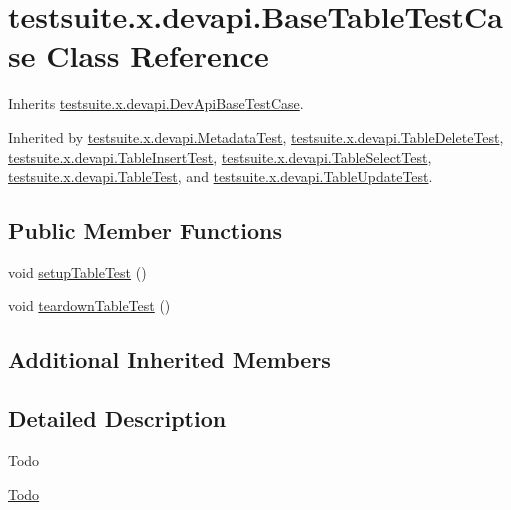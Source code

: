 \hypertarget{classtestsuite_1_1x_1_1devapi_1_1_base_table_test_case}{}\section{testsuite.\+x.\+devapi.\+Base\+Table\+Test\+Case Class Reference}
\label{classtestsuite_1_1x_1_1devapi_1_1_base_table_test_case}


Inherits \mbox{\hyperlink{classtestsuite_1_1x_1_1devapi_1_1_dev_api_base_test_case}{testsuite.\+x.\+devapi.\+Dev\+Api\+Base\+Test\+Case}}.



Inherited by \mbox{\hyperlink{classtestsuite_1_1x_1_1devapi_1_1_metadata_test}{testsuite.\+x.\+devapi.\+Metadata\+Test}}, \mbox{\hyperlink{classtestsuite_1_1x_1_1devapi_1_1_table_delete_test}{testsuite.\+x.\+devapi.\+Table\+Delete\+Test}}, \mbox{\hyperlink{classtestsuite_1_1x_1_1devapi_1_1_table_insert_test}{testsuite.\+x.\+devapi.\+Table\+Insert\+Test}}, \mbox{\hyperlink{classtestsuite_1_1x_1_1devapi_1_1_table_select_test}{testsuite.\+x.\+devapi.\+Table\+Select\+Test}}, \mbox{\hyperlink{classtestsuite_1_1x_1_1devapi_1_1_table_test}{testsuite.\+x.\+devapi.\+Table\+Test}}, and \mbox{\hyperlink{classtestsuite_1_1x_1_1devapi_1_1_table_update_test}{testsuite.\+x.\+devapi.\+Table\+Update\+Test}}.

\subsection*{Public Member Functions}
\begin{DoxyCompactItemize}
\item 
void \mbox{\hyperlink{classtestsuite_1_1x_1_1devapi_1_1_base_table_test_case_ab75cadb98051a2ce2054cf8a1e870375}{setup\+Table\+Test}} ()
\item 
void \mbox{\hyperlink{classtestsuite_1_1x_1_1devapi_1_1_base_table_test_case_acd54bd05e05774f819784bbc94c31535}{teardown\+Table\+Test}} ()
\end{DoxyCompactItemize}
\subsection*{Additional Inherited Members}


\subsection{Detailed Description}
\begin{DoxyRefDesc}{Todo}
\item[\mbox{\hyperlink{todo__todo000004}{Todo}}]\end{DoxyRefDesc}


